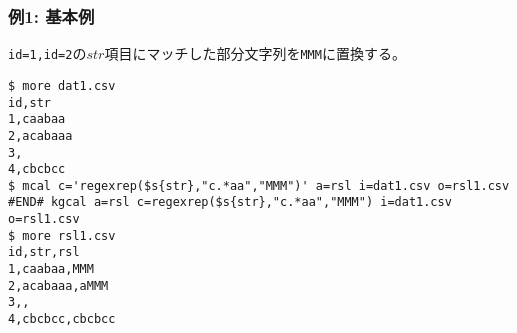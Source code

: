 \subsubsection*{例1: 基本例}

\verb|id=1,id=2|の$str$項目にマッチした部分文字列を\verb|MMM|に置換する。


\begin{Verbatim}[baselinestretch=0.7,frame=single]
$ more dat1.csv
id,str
1,caabaa
2,acabaaa
3,
4,cbcbcc
$ mcal c='regexrep($s{str},"c.*aa","MMM")' a=rsl i=dat1.csv o=rsl1.csv
#END# kgcal a=rsl c=regexrep($s{str},"c.*aa","MMM") i=dat1.csv o=rsl1.csv
$ more rsl1.csv
id,str,rsl
1,caabaa,MMM
2,acabaaa,aMMM
3,,
4,cbcbcc,cbcbcc
\end{Verbatim}
